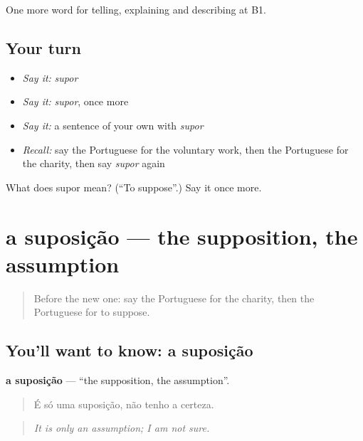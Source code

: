 \begin{grammarlens}[title={What you've built}]
One more word for telling, explaining and describing at B1.
\end{grammarlens}

\subsection*{Your turn}
\begin{itemize}
\raggedright
  \item \emph{Say it:} \emph{supor}
  \item \emph{Say it:} \emph{supor}, once more
  \item \emph{Say it:} a sentence of your own with \emph{supor}
  \item \emph{Recall:} say the Portuguese for the voluntary work, then the Portuguese for the charity, then say \emph{supor} again
\end{itemize}

\begin{tcolorbox}[breakable,colback=teal!4,colframe=teal!35!black,title={Before you move on}]
What does supor mean? (\textquotedblleft{}To suppose\textquotedblright{}.) Say it once more.
\end{tcolorbox}
\section[a suposição]{a suposição — the supposition, the assumption}

\label{lesson:PT-C368-suposicao}



\begin{quote}
Before the new one: say the Portuguese for the charity, then the Portuguese for to suppose.
\end{quote}

\subsection*{You'll want to know: a suposição}
\textbf{a suposição} — \textquotedblleft{}the supposition, the assumption\textquotedblright{}.

\begin{quote}
É só uma suposição, não tenho a certeza.
\end{quote}

\begin{quote}
\emph{It is only an assumption; I am not sure.}
\end{quote}

